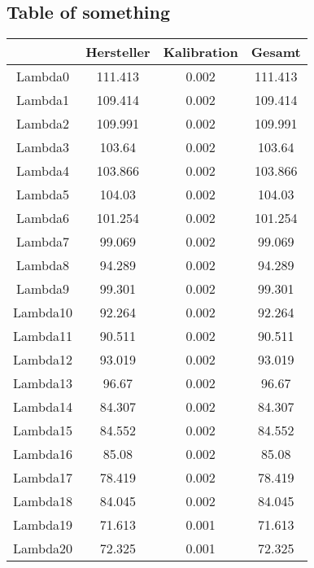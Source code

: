 \documentclass{article}
\begin{document}
\subsection{Table of something}
\begin{tabular}{c|c|c|c}
 &Hersteller&Kalibration&Gesamt\\
\hline
Lambda0&111.413&0.002&111.413\\
Lambda1&109.414&0.002&109.414\\
Lambda2&109.991&0.002&109.991\\
Lambda3&103.64&0.002&103.64\\
Lambda4&103.866&0.002&103.866\\
Lambda5&104.03&0.002&104.03\\
Lambda6&101.254&0.002&101.254\\
Lambda7&99.069&0.002&99.069\\
Lambda8&94.289&0.002&94.289\\
Lambda9&99.301&0.002&99.301\\
Lambda10&92.264&0.002&92.264\\
Lambda11&90.511&0.002&90.511\\
Lambda12&93.019&0.002&93.019\\
Lambda13&96.67&0.002&96.67\\
Lambda14&84.307&0.002&84.307\\
Lambda15&84.552&0.002&84.552\\
Lambda16&85.08&0.002&85.08\\
Lambda17&78.419&0.002&78.419\\
Lambda18&84.045&0.002&84.045\\
Lambda19&71.613&0.001&71.613\\
Lambda20&72.325&0.001&72.325\\
\end{tabular}
\end{document}
